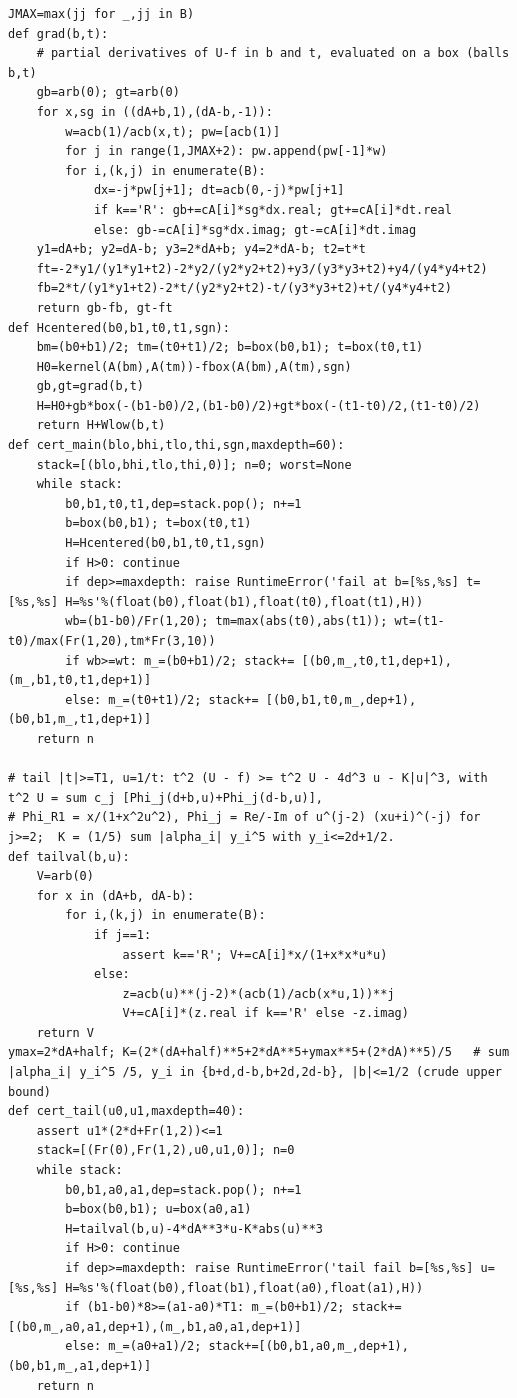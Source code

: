 \documentclass[11pt,reqno]{amsart}
\numberwithin{equation}{section}
\theoremstyle{definition}
\theoremstyle{remark}
\begin{document}
\begin{lstlisting}
JMAX=max(jj for _,jj in B)
def grad(b,t):
    # partial derivatives of U-f in b and t, evaluated on a box (balls b,t)
    gb=arb(0); gt=arb(0)
    for x,sg in ((dA+b,1),(dA-b,-1)):
        w=acb(1)/acb(x,t); pw=[acb(1)]
        for j in range(1,JMAX+2): pw.append(pw[-1]*w)
        for i,(k,j) in enumerate(B):
            dx=-j*pw[j+1]; dt=acb(0,-j)*pw[j+1]
            if k=='R': gb+=cA[i]*sg*dx.real; gt+=cA[i]*dt.real
            else: gb-=cA[i]*sg*dx.imag; gt-=cA[i]*dt.imag
    y1=dA+b; y2=dA-b; y3=2*dA+b; y4=2*dA-b; t2=t*t
    ft=-2*y1/(y1*y1+t2)-2*y2/(y2*y2+t2)+y3/(y3*y3+t2)+y4/(y4*y4+t2)
    fb=2*t/(y1*y1+t2)-2*t/(y2*y2+t2)-t/(y3*y3+t2)+t/(y4*y4+t2)
    return gb-fb, gt-ft
def Hcentered(b0,b1,t0,t1,sgn):
    bm=(b0+b1)/2; tm=(t0+t1)/2; b=box(b0,b1); t=box(t0,t1)
    H0=kernel(A(bm),A(tm))-fbox(A(bm),A(tm),sgn)
    gb,gt=grad(b,t)
    H=H0+gb*box(-(b1-b0)/2,(b1-b0)/2)+gt*box(-(t1-t0)/2,(t1-t0)/2)
    return H+Wlow(b,t)
def cert_main(blo,bhi,tlo,thi,sgn,maxdepth=60):
    stack=[(blo,bhi,tlo,thi,0)]; n=0; worst=None
    while stack:
        b0,b1,t0,t1,dep=stack.pop(); n+=1
        b=box(b0,b1); t=box(t0,t1)
        H=Hcentered(b0,b1,t0,t1,sgn)
        if H>0: continue
        if dep>=maxdepth: raise RuntimeError('fail at b=[%s,%s] t=[%s,%s] H=%s'%(float(b0),float(b1),float(t0),float(t1),H))
        wb=(b1-b0)/Fr(1,20); tm=max(abs(t0),abs(t1)); wt=(t1-t0)/max(Fr(1,20),tm*Fr(3,10))
        if wb>=wt: m_=(b0+b1)/2; stack+= [(b0,m_,t0,t1,dep+1),(m_,b1,t0,t1,dep+1)]
        else: m_=(t0+t1)/2; stack+= [(b0,b1,t0,m_,dep+1),(b0,b1,m_,t1,dep+1)]
    return n

# tail |t|>=T1, u=1/t: t^2 (U - f) >= t^2 U - 4d^3 u - K|u|^3, with t^2 U = sum c_j [Phi_j(d+b,u)+Phi_j(d-b,u)],
# Phi_R1 = x/(1+x^2u^2), Phi_j = Re/-Im of u^(j-2) (xu+i)^(-j) for j>=2;  K = (1/5) sum |alpha_i| y_i^5 with y_i<=2d+1/2.
def tailval(b,u):
    V=arb(0)
    for x in (dA+b, dA-b):
        for i,(k,j) in enumerate(B):
            if j==1:
                assert k=='R'; V+=cA[i]*x/(1+x*x*u*u)
            else:
                z=acb(u)**(j-2)*(acb(1)/acb(x*u,1))**j
                V+=cA[i]*(z.real if k=='R' else -z.imag)
    return V
ymax=2*dA+half; K=(2*(dA+half)**5+2*dA**5+ymax**5+(2*dA)**5)/5   # sum |alpha_i| y_i^5 /5, y_i in {b+d,d-b,b+2d,2d-b}, |b|<=1/2 (crude upper bound)
def cert_tail(u0,u1,maxdepth=40):
    assert u1*(2*d+Fr(1,2))<=1
    stack=[(Fr(0),Fr(1,2),u0,u1,0)]; n=0
    while stack:
        b0,b1,a0,a1,dep=stack.pop(); n+=1
        b=box(b0,b1); u=box(a0,a1)
        H=tailval(b,u)-4*dA**3*u-K*abs(u)**3
        if H>0: continue
        if dep>=maxdepth: raise RuntimeError('tail fail b=[%s,%s] u=[%s,%s] H=%s'%(float(b0),float(b1),float(a0),float(a1),H))
        if (b1-b0)*8>=(a1-a0)*T1: m_=(b0+b1)/2; stack+=[(b0,m_,a0,a1,dep+1),(m_,b1,a0,a1,dep+1)]
        else: m_=(a0+a1)/2; stack+=[(b0,b1,a0,m_,dep+1),(b0,b1,m_,a1,dep+1)]
    return n


\end{lstlisting}
\end{document}
